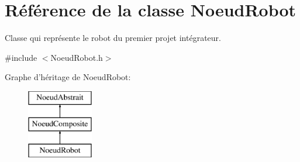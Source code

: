 \hypertarget{class_noeud_robot}{\section{Référence de la classe Noeud\-Robot}
\label{class_noeud_robot}
}


Classe qui représente le robot du premier projet intégrateur.  




{\ttfamily \#include $<$Noeud\-Robot.\-h$>$}

Graphe d'héritage de Noeud\-Robot\-:\begin{figure}[H]
\begin{center}
\leavevmode
\includegraphics[height=3.000000cm]{class_noeud_robot}
\end{center}
\end{figure}
